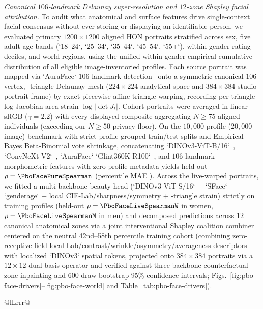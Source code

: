 \emph{Canonical $106$-landmark Delaunay super-resolution and $12$-zone Shapley facial attribution.} To audit what anatomical
and surface features drive single-context facial consensus without ever storing or displaying an identifiable person, we
evaluated \PboFaceTotalN{} primary $1200\times 1200$ aligned HON portraits stratified across sex, five adult age bands
(`18--24`, `25--34`, `35--44`, `45--54`, `55+`), within-gender rating deciles, and \PboFaceWorldRegionsN{} world regions,
using the unified within-gender empirical cumulative distribution of all \PboHonImages{} eligible image-inventoried profiles.
Each source portrait was mapped via `AuraFace` $106$-landmark detection~\cite{deng2019arcface} onto a symmetric canonical
$106$-vertex, \PboFaceTrisN-triangle Delaunay mesh ($224\times 224$ analytical space and $384\times 384$ studio portrait
frame) by exact piecewise-affine triangle warping, recording per-triangle log-Jacobian area strain $\log|\det J_t|$. Cohort
portraits were averaged in linear sRGB ($\gamma=2.2$) with every displayed composite aggregating $N\ge 75$ aligned individuals
(exceeding our $N\ge 50$ privacy floor). On the $10{,}000$-profile ($20{,}000$-image) benchmark with strict profile-grouped
train/test splits and Empirical-Bayes Beta-Binomial vote shrinkage, concatenating `DINOv3-ViT-B/16`~\cite{oquab2024dinov2},
`ConvNeXt V2`~\cite{woo2023convnextv2}, `AuraFace` `Glint360K-R100`~\cite{deng2019arcface}, and $106$-landmark morphometric
features with zero profile metadata yields held-out $\rho=\PboFacePureSpearman$ (percentile MAE \PboFacePurePctMae). Across
the \PboFaceTotalN{} live-warped portraits, we fitted a multi-backbone beauty head (`DINOv3-ViT-S/16` + `SFace` +
`genderage` + local CIE-Lab/sharpness/symmetry + \PboFaceTrisN-triangle strain) strictly on training profiles (held-out
$\rho=\PboFaceLiveSpearmanW$ in women, $\rho=\PboFaceLiveSpearmanM$ in men) and decomposed predictions across $12$ canonical
anatomical zones via a joint interventional Shapley coalition combiner~\cite{lundberg2017shap} centered on the neutral
42nd--58th percentile training cohort (combining zero-receptive-field local Lab/contrast/wrinkle/asymmetry/averageness
descriptors with localized `DINOv3` spatial tokens, projected onto $384\times 384$ portraits via a $12\times 12$ dual-basis
operator and verified against three-backbone counterfactual zone inpainting and $600$-draw bootstrap 95\% confidence
intervals; Figs.~\ref{fig:pbo-face-drivers}--\ref{fig:pbo-face-world} and Table~\ref{tab:pbo-face-drivers}).

\begin{table}[t]
\caption{Audited progression of the 20-wave HON facial-rating benchmark across $10{,}000$ profiles ($20{,}000$ images;
profile-grouped held-out test metrics). Even after removing background artifacts, adding multi-photo aggregation, and
stacking vision backbones with metadata, single-channel static imagery leaves \PboBenchUnexplainedPct{} of human-jury
consensus variance unexplained.}\label{tab:pbo-ai-bench}
\footnotesize
\centering
\begin{tabularx}{\textwidth}{@{}lLrrr@{}}
\toprule
{}
\bottomrule
\end{tabularx}
\end{table}
